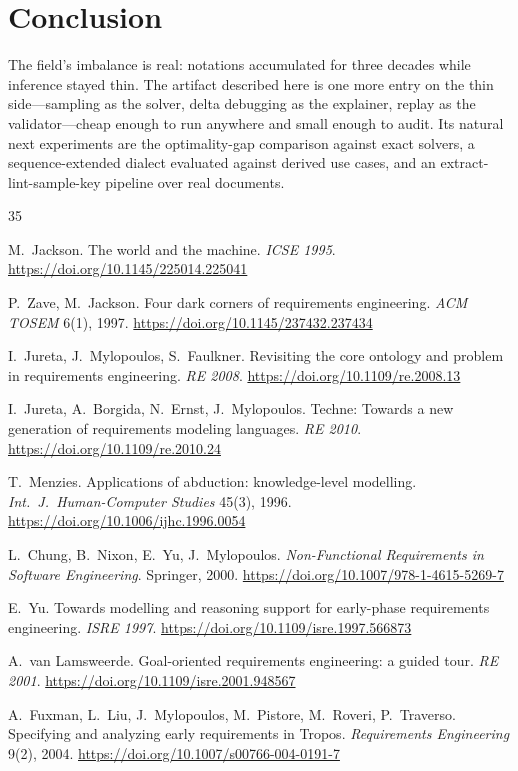 \documentclass[sigconf,nonacm]{acmart}
\begin{document}
\section{Conclusion}

The field's imbalance is real: notations accumulated for three
decades while inference stayed thin. The artifact described
here is one more entry on the thin side---sampling as the
solver, delta debugging as the explainer, replay as the
validator---cheap enough to run anywhere and small enough to
audit. Its natural next experiments are the optimality-gap
comparison against exact solvers, a sequence-extended dialect
evaluated against derived use cases, and an
extract-lint-sample-key pipeline over real documents.

\begin{thebibliography}{35}

 M.~Jackson. The world and the machine.
\emph{ICSE 1995}. \url{https://doi.org/10.1145/225014.225041}

 P.~Zave, M.~Jackson. Four dark corners of
requirements engineering. \emph{ACM TOSEM} 6(1), 1997.
\url{https://doi.org/10.1145/237432.237434}

 I.~Jureta, J.~Mylopoulos, S.~Faulkner.
Revisiting the core ontology and problem in requirements
engineering. \emph{RE 2008}.
\url{https://doi.org/10.1109/re.2008.13}

 I.~Jureta, A.~Borgida, N.~Ernst,
J.~Mylopoulos. Techne: Towards a new generation of requirements
modeling languages. \emph{RE 2010}.
\url{https://doi.org/10.1109/re.2010.24}

 T.~Menzies. Applications of abduction:
knowledge-level modelling. \emph{Int.\ J.\ Human-Computer
Studies} 45(3), 1996.
\url{https://doi.org/10.1006/ijhc.1996.0054}

 L.~Chung, B.~Nixon, E.~Yu, J.~Mylopoulos.
\emph{Non-Functional Requirements in Software Engineering}.
Springer, 2000.
\url{https://doi.org/10.1007/978-1-4615-5269-7}

 E.~Yu. Towards modelling and reasoning support
for early-phase requirements engineering. \emph{ISRE 1997}.
\url{https://doi.org/10.1109/isre.1997.566873}

 A.~van Lamsweerde. Goal-oriented
requirements engineering: a guided tour. \emph{RE 2001}.
\url{https://doi.org/10.1109/isre.2001.948567}

 A.~Fuxman, L.~Liu, J.~Mylopoulos,
M.~Pistore, M.~Roveri, P.~Traverso. Specifying and analyzing
early requirements in Tropos. \emph{Requirements Engineering}
9(2), 2004. \url{https://doi.org/10.1007/s00766-004-0191-7}


\end{thebibliography}
\end{document}
